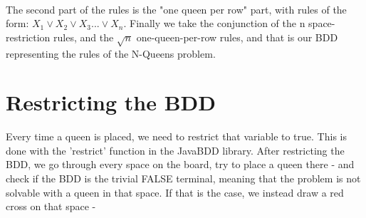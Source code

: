 \documentclass{llncs}
\begin{document}
\paragraph{}
The second part of the rules is the "one queen per row" part, with rules of the form:
$X_1 \lor X_2 \lor X_3 ... \lor X_n$. Finally we take the conjunction of the n space-restriction rules, and the $\sqrt{n}$ one-queen-per-row rules, and that is our BDD representing the rules of the N-Queens problem.
\section{Restricting the BDD}
Every time a queen is placed, we need to restrict that variable to true. This is done with the 'restrict' function in the JavaBDD library. After restricting the BDD, we go through every space on the board, try to place a queen there - and check if the BDD is the trivial FALSE terminal, meaning that the problem is not solvable with a queen in that space. If that is the case, we instead draw a red cross on that space - 
\end{document}
